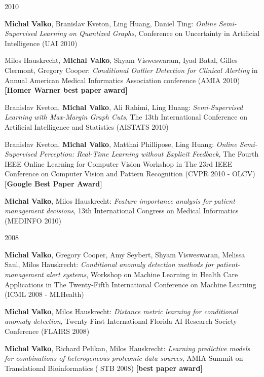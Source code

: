 \documentclass{resume}
\begin{document}
\begin{category}{2010}


\citembullet    
{\bf Michal Valko}, Branislav Kveton, Ling Huang, Daniel Ting: 
\emph{Online Semi-Supervised Learning on Quantized Graphs},
Conference on Uncertainty in Artificial Intelligence
({\sf UAI 2010})

\citembullet
Milos Hauskrecht, {\bf Michal Valko},  Shyam Visweswaram, Iyad Batal, Gilles Clermont, Gregory Cooper:
\emph{Conditional Outlier Detection for Clinical Alerting} in Annual American Medical Informatics
Association conference ({\sf AMIA 2010}) 
{\bf [Homer Warner best paper award]}

\citembullet
Branislav Kveton, {\bf Michal Valko}, Ali Rahimi, Ling Huang:
\emph{Semi-Supervised Learning with Max-Margin Graph Cuts},
The 13th International Conference on Artificial Intelligence and Statistics
({\sf AISTATS 2010})

\citembullet
Branislav Kveton, {\bf Michal Valko}, Matthai Phillipose, Ling Huang:
\emph{Online Semi-Supervised Perception: Real-Time Learning without Explicit
Feedback},
The Fourth IEEE Online Learning for Computer Vision Workshop in The 23rd IEEE
Conference on Computer Vision and Pattern Recognition
({\sf CVPR 2010 - OLCV})  {\bf [Google Best Paper Award]}


\citembullet
{\bf Michal Valko}, Milos Hauskrecht:
\emph{Feature importance analysis for patient management decisions}, 
13th International Congress on Medical Informatics ({\sf MEDINFO 2010})

\end{category}
\begin{category}{2008}


\citembullet
{\bf Michal Valko}, Gregory Cooper, Amy Seybert, Shyam Visweswaran, Melissa Saul, Milos Hauskrecht:
\emph{Conditional anomaly detection methods for patient-management alert systems}, Workshop on
Machine Learning in Health Care Applications in The Twenty-Fifth International Conference on
Machine Learning ({\sf ICML 2008 - MLHealth})

\citembullet    
{\bf Michal Valko}, Milos Hauskrecht: \emph{Distance metric learning for conditional anomaly detection},
Twenty-First International Florida AI Research Society Conference ({\sf FLAIRS 2008})

\citembullet    
{\bf Michal Valko},  Richard Pelikan, Milos Hauskrecht: \emph{Learning predictive models for combinations of heterogeneous
proteomic data sources}, AMIA Summit on Translational Bioinformatics ({\sf
      STB 2008})  {\bf [best paper award]}

\end{category}
\end{document}
